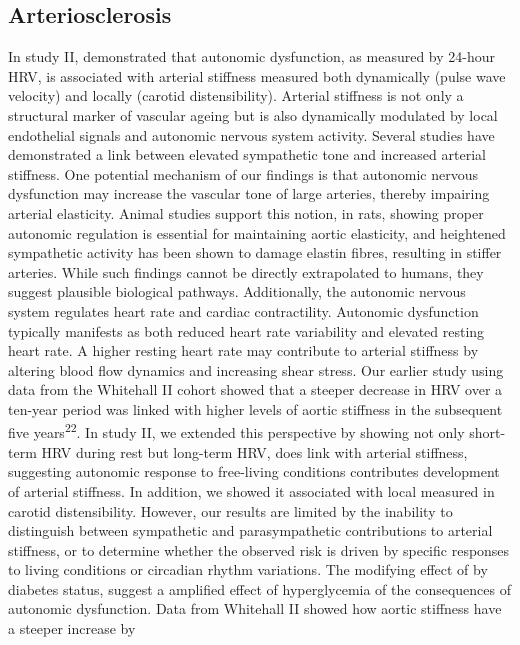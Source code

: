\documentclass[
  a4paper,
  headsepline=true,
  open=any]{scrbook}
\begin{document}
\hypertarget{arteriosclerosis-1}{%
\subsection{Arteriosclerosis}\label{arteriosclerosis-1}}

In study II, demonstrated that autonomic dysfunction, as measured by
24-hour HRV, is associated with arterial stiffness measured both
dynamically (pulse wave velocity) and locally (carotid distensibility).
Arterial stiffness is not only a structural marker of vascular ageing
but is also dynamically modulated by local endothelial signals and
autonomic nervous system activity. Several studies have demonstrated a
link between elevated sympathetic tone and increased arterial stiffness.
One potential mechanism of our findings is that autonomic nervous
dysfunction may increase the vascular tone of large arteries, thereby
impairing arterial elasticity. Animal studies support this notion, in
rats, showing proper autonomic regulation is essential for maintaining
aortic elasticity, and heightened sympathetic activity has been shown to
damage elastin fibres, resulting in stiffer arteries. While such
findings cannot be directly extrapolated to humans, they suggest
plausible biological pathways. Additionally, the autonomic nervous
system regulates heart rate and cardiac contractility. Autonomic
dysfunction typically manifests as both reduced heart rate variability
and elevated resting heart rate. A higher resting heart rate may
contribute to arterial stiffness by altering blood flow dynamics and
increasing shear stress. Our earlier study using data from the Whitehall
II cohort showed that a steeper decrease in HRV over a ten-year period
was linked with higher levels of aortic stiffness in the subsequent five
years\textsuperscript{22}. In study II, we extended this perspective by
showing not only short-term HRV during rest but long-term HRV, does link
with arterial stiffness, suggesting autonomic response to free-living
conditions contributes development of arterial stiffness. In addition,
we showed it associated with local measured in carotid distensibility.
However, our results are limited by the inability to distinguish between
sympathetic and parasympathetic contributions to arterial stiffness, or
to determine whether the observed risk is driven by specific responses
to living conditions or circadian rhythm variations. The modifying
effect of by diabetes status, suggest a amplified effect of
hyperglycemia of the consequences of autonomic dysfunction. Data from
Whitehall II showed how aortic stiffness have a steeper increase by
\end{document}

